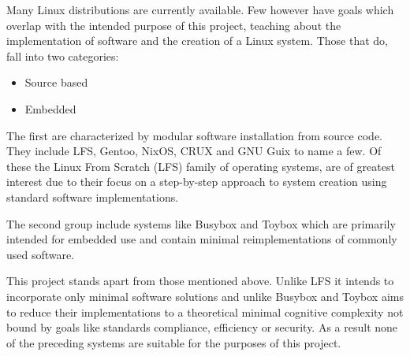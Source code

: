 Many Linux distributions are currently available. Few however have goals which overlap with the intended purpose of this project, teaching about the implementation of software and the creation of a Linux system. Those that do, fall into two categories:

\begin{itemize}
    \item Source based
    \item Embedded
\end{itemize}

The first are characterized by modular software installation from source code. They include LFS, Gentoo, NixOS, CRUX and GNU Guix to name a few. Of these the Linux From Scratch (LFS) family of operating systems, are of greatest interest due to their focus on a step-by-step approach to system creation using standard software implementations. 

The second group include systems like Busybox and Toybox which are primarily intended for embedded use and contain minimal reimplementations of commonly used software.

This project stands apart from those mentioned above. Unlike LFS it intends to incorporate only minimal software solutions and unlike Busybox and Toybox aims to reduce their implementations to a theoretical minimal cognitive complexity not bound by goals like standards compliance, efficiency or security. As a result none of the preceding systems are suitable for the purposes of this project.
